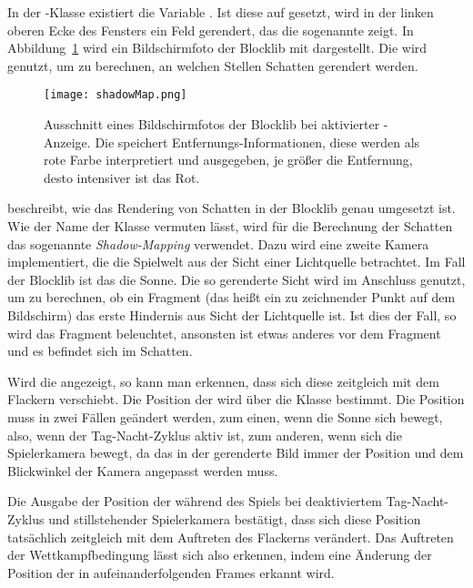 In der \classConfiguration{}-Klasse existiert die Variable . Ist diese auf  gesetzt, wird in der linken oberen Ecke des Fensters ein Feld gerendert, das die sogenannte \classShadowMap{} zeigt. In Abbildung~\ref{fig:ShadowMap} wird ein Bildschirmfoto der Blocklib mit  dargestellt. Die \classShadowMap{} wird genutzt, um zu berechnen, an welchen Stellen Schatten gerendert werden.
\begin{figure}
	\centering
	\texttt{[image: shadowMap.png]}
	\caption[Ausschnitt eines Bildschirmfotos der Blocklib bei aktivierter \classShadowMap{}-Anzeige.]{Ausschnitt eines Bildschirmfotos der Blocklib bei aktivierter \classShadowMap{}-Anzeige. Die \classShadowMap{} speichert Entfernungs-Informationen, diese werden als rote Farbe interpretiert und ausgegeben, je größer die Entfernung, desto intensiver ist das Rot.}\label{fig:ShadowMap}
\end{figure}
\textcite{Ebbinger2018} beschreibt, wie das Rendering von Schatten in der Blocklib genau umgesetzt ist. Wie der Name der Klasse \classShadowMap{} vermuten lässt, wird für die Berechnung der Schatten das sogenannte \emph{Shadow-Mapping} verwendet. Dazu wird eine zweite Kamera implementiert, die die Spielwelt aus der Sicht einer Lichtquelle betrachtet. Im Fall der Blocklib ist das die Sonne. Die so gerenderte Sicht wird im Anschluss genutzt, um zu berechnen, ob ein Fragment (das heißt ein zu zeichnender Punkt auf dem Bildschirm) das erste Hindernis aus Sicht der Lichtquelle ist. Ist dies der Fall, so wird das Fragment beleuchtet, ansonsten ist etwas anderes vor dem Fragment und es befindet sich im Schatten.

Wird die \classShadowMap{} angezeigt, so kann man erkennen, dass sich diese zeitgleich mit dem Flackern verschiebt. Die Position der \classShadowMap{} wird über die Klasse \classShadowBounds{} bestimmt. Die Position muss in zwei Fällen geändert werden, zum einen, wenn die Sonne sich bewegt, also, wenn der Tag-Nacht-Zyklus aktiv ist, zum anderen, wenn sich die Spielerkamera bewegt, da das in der \classShadowMap{} gerenderte Bild immer der Position und dem Blickwinkel der Kamera angepasst werden muss.

Die Ausgabe der Position der \classShadowBounds{} während des Spiels bei deaktiviertem Tag-Nacht-Zyklus und stillstehender Spielerkamera bestätigt, dass sich diese Position tatsächlich zeitgleich mit dem Auftreten des Flackerns verändert. Das Auftreten der Wettkampfbedingung lässt sich also erkennen, indem eine Änderung der Position der \classShadowBounds{} in aufeinanderfolgenden Frames erkannt wird.

